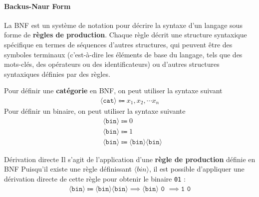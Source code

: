 \documentclass{report}
\begin{document}
\begin{multicols*}{3}
    \paragraph{Backus-Naur Form}
    La BNF est un système de notation pour décrire la syntaxe d'un langage sous forme de \textbf{règles de production}.
    Chaque règle décrit une structure syntaxique spécifique en termes de séquences d'autres structures, qui peuvent être 
    des symboles terminaux (c'est-à-dire les éléments de base du langage, tels que des mots-clés, des opérateurs ou des identificateurs)
    ou d'autres structures syntaxiques définies par des règles.

    \begin{EExample}{}{}
        Pour définir une \textbf{catégorie} en BNF, on peut utiliser la syntaxe suivant 
        \begin{align*}
            \langle \texttt{cat} \rangle \Coloneqq x_1, x_2, \cdots x_n
        \end{align*}
        Pour définir un binaire, on peut utiliser la syntaxe suivante
        \begin{align*}
             &\langle \texttt{bin} \rangle \Coloneqq 0 \\       
             &\langle \texttt{bin} \rangle \Coloneqq 1 \\
             &\langle \texttt{bin} \rangle \Coloneqq \langle \texttt{bin}  \rangle \langle \texttt{bin} \rangle
        \end{align*}
    \end{EExample}




    \begin{Definitionx}{Dérivation directe}{}
        Il s'agit de l'application d'une \textbf{règle de production} définie en BNF  
        Puisqu'il existe une règle définissant $\langle bin \rangle$, il est possible 
        d'appliquer une dérivation directe de cette règle pour obtenir le binaire \texttt{01} :
        \begin{align*}
            \langle \texttt{bin}   \rangle \Coloneqq \langle \texttt{bin} \rangle \langle \texttt{bin} \rangle 
            \implies \langle \texttt{bin} \rangle \texttt{ 0 } \implies \texttt{1 0}  
        \end{align*}
    \end{Definitionx}


\end{multicols*}
\end{document}
